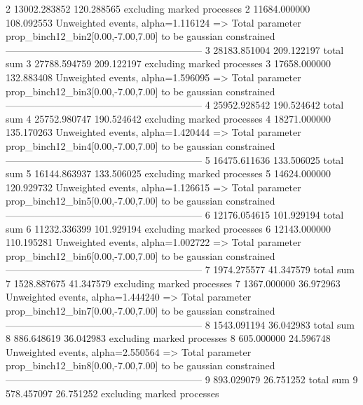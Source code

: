 2          13002.283852    120.288565      excluding marked processes    
2          11684.000000    108.092553      Unweighted events, alpha=1.116124
  => Total parameter prop_binch12_bin2[0.00,-7.00,7.00] to be gaussian constrained
------------------------------------------------------------
3          28183.851004    209.122197      total sum                     
3          27788.594759    209.122197      excluding marked processes    
3          17658.000000    132.883408      Unweighted events, alpha=1.596095
  => Total parameter prop_binch12_bin3[0.00,-7.00,7.00] to be gaussian constrained
------------------------------------------------------------
4          25952.928542    190.524642      total sum                     
4          25752.980747    190.524642      excluding marked processes    
4          18271.000000    135.170263      Unweighted events, alpha=1.420444
  => Total parameter prop_binch12_bin4[0.00,-7.00,7.00] to be gaussian constrained
------------------------------------------------------------
5          16475.611636    133.506025      total sum                     
5          16144.863937    133.506025      excluding marked processes    
5          14624.000000    120.929732      Unweighted events, alpha=1.126615
  => Total parameter prop_binch12_bin5[0.00,-7.00,7.00] to be gaussian constrained
------------------------------------------------------------
6          12176.054615    101.929194      total sum                     
6          11232.336399    101.929194      excluding marked processes    
6          12143.000000    110.195281      Unweighted events, alpha=1.002722
  => Total parameter prop_binch12_bin6[0.00,-7.00,7.00] to be gaussian constrained
------------------------------------------------------------
7          1974.275577     41.347579       total sum                     
7          1528.887675     41.347579       excluding marked processes    
7          1367.000000     36.972963       Unweighted events, alpha=1.444240
  => Total parameter prop_binch12_bin7[0.00,-7.00,7.00] to be gaussian constrained
------------------------------------------------------------
8          1543.091194     36.042983       total sum                     
8          886.648619      36.042983       excluding marked processes    
8          605.000000      24.596748       Unweighted events, alpha=2.550564
  => Total parameter prop_binch12_bin8[0.00,-7.00,7.00] to be gaussian constrained
------------------------------------------------------------
9          893.029079      26.751252       total sum                     
9          578.457097      26.751252       excluding marked processes    
